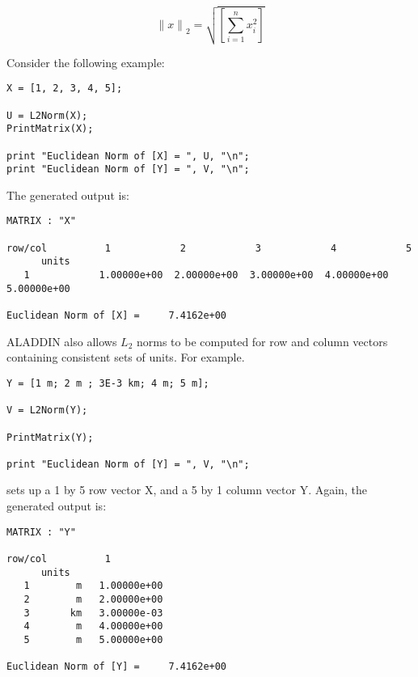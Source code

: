 \begin{equation}
{\| x \|}_2 = \sqrt{\left[ {\sum_{i=1}^{n} {x_i^2}} \right]}
\label{eq: L2-Norm}
\end{equation}

\vspace{0.15 in}\noindent
Consider the following example:

\begin{footnotesize}
\begin{verbatim}
X = [1, 2, 3, 4, 5];

U = L2Norm(X);
PrintMatrix(X);

print "Euclidean Norm of [X] = ", U, "\n";
print "Euclidean Norm of [Y] = ", V, "\n";
\end{verbatim}
\end{footnotesize}

\vspace{0.05 in}\noindent
The generated output is:

\begin{footnotesize}
\begin{verbatim}
MATRIX : "X"

row/col          1            2            3            4            5          
      units                                                     
   1            1.00000e+00  2.00000e+00  3.00000e+00  4.00000e+00  5.00000e+00

Euclidean Norm of [X] =     7.4162e+00 
\end{verbatim}
\end{footnotesize}

\vspace{0.05 in}\noindent
ALADDIN also allows $L_2$ norms to be computed for
row and column vectors containing consistent sets of units.
For example.

\begin{footnotesize}
\begin{verbatim}
Y = [1 m; 2 m ; 3E-3 km; 4 m; 5 m];

V = L2Norm(Y);

PrintMatrix(Y);

print "Euclidean Norm of [Y] = ", V, "\n";
\end{verbatim}
\end{footnotesize}

\vspace{0.05 in}\noindent
sets up a 1 by 5 row vector X, and a 5 by 1 column vector Y.
Again, the generated output is:

\begin{footnotesize}
\begin{verbatim}
MATRIX : "Y"

row/col          1          
      units             
   1        m   1.00000e+00
   2        m   2.00000e+00
   3       km   3.00000e-03
   4        m   4.00000e+00
   5        m   5.00000e+00

Euclidean Norm of [Y] =     7.4162e+00 
\end{verbatim}
\end{footnotesize}

